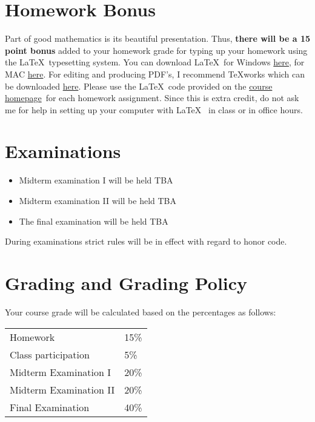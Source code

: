\documentclass[12pt]{article}
\newcommand{\ingreen}[1]{\color{green}\textbf{#1} \color{black}}
\newcommand{\coursewebpage}{\href{https://github.com/kapelner/QC_Math_241_Fall_2014_15}{course homepage}}
\begin{document}
\section*{Homework Bonus}

Part of good mathematics is its beautiful presentation. Thus, \ingreen{there will be a 15 point bonus} added to your homework grade  for typing up your homework using the \LaTeX ~typesetting system. You can download \LaTeX ~for Windows \href{http://www.miktex.org/download}{here}, for MAC \href{http://www.tug.org/mactex/}{here}. For editing and producing PDF's, I recommend \TeX works which can be downloaded \href{http://www.tug.org/texworks/#Getting_TeXworks}{here}. Please use the \LaTeX ~code provided on the \coursewebpage ~for each homework assignment. Since this is extra credit, do not ask me for help in setting up your computer with \LaTeX~ in class or in office hours.

\section*{Examinations}

\begin{itemize}
\itemsep -0.0em 
\item Midterm examination I will be held TBA
\item Midterm examination II will be held TBA
\item The final examination will be held TBA
\end{itemize}

During examinations strict rules will be in effect with regard to honor code.

\section*{Grading and Grading Policy}

Your course grade will be calculated based on the percentages as follows: 

\begin{table}[htp]
\centering
\begin{tabular}{l|l}
Homework & 15\% \\
Class participation & 5\% \\
Midterm Examination I & 20\%\\
Midterm Examination II & 20\%\\
Final Examination & 40\%
\end{tabular}
\end{table}
\end{document}
